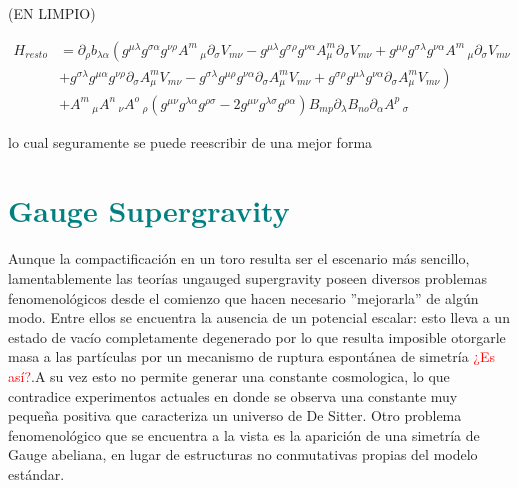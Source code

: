 \documentclass{article}
\numberwithin{equation}{section}
\begin{document}
(EN LIMPIO)

\begin{equation}
\begin{aligned}
H_{resto}&= \partial_{\rho}{b_{\lambda \alpha}} \left( g^{\mu \lambda} g^{\sigma \alpha} g^{\nu \rho} A^{m}\,_{\mu} \partial_{\sigma}{V_{m \nu}} -g^{\mu \lambda} g^{\sigma \rho} g^{\nu \alpha} A^{m}_{\mu} \partial_{\sigma}{V_{m \nu}}+g^{\mu \rho} g^{\sigma \lambda} g^{\nu \alpha} A^{m}\,_{\mu} \partial_{\sigma}{V_{m \nu}} \right.\\
& \left. +g^{\sigma \lambda} g^{\mu \alpha} g^{\nu \rho} \partial_{\sigma}{A^{m}_{\mu}} V_{m \nu} -g^{\sigma \lambda} g^{\mu \rho} g^{\nu \alpha} \partial_{\sigma}{A^{m}_{\mu}} V_{m \nu}+g^{\sigma \rho} g^{\mu \lambda} g^{\nu \alpha} \partial_{\sigma}{A^{m}_{\mu}} V_{m \nu} \right)\\
& + A^{m}\,_{\mu} A^{n}\,_{\nu} A^{o}\,_{\rho} \left( g^{\mu \nu} g^{\lambda \alpha} g^{\rho \sigma}  - 2 g^{\mu \nu} g^{\lambda \sigma} g^{\rho \alpha} \right) B_{m p} \partial_{\lambda}{B_{n o}} \partial_{\alpha}{A^{p}\,_{\sigma}}
\end{aligned}
\end{equation}

lo cual seguramente se puede reescribir de una mejor forma

\section{\textcolor{teal}{Gauge Supergravity}}

Aunque la compactificación en un toro resulta ser el escenario más sencillo, lamentablemente las teorías ungauged supergravity poseen diversos problemas fenomenológicos desde el comienzo que hacen necesario ''mejorarla'' de algún modo. Entre ellos se encuentra la ausencia de un potencial escalar: esto lleva a un estado de vacío completamente degenerado por lo que resulta imposible otorgarle masa a las partículas por un mecanismo de ruptura espontánea de simetría \textcolor{red}{¿Es así?}.A su vez esto no permite generar una constante cosmologica, lo que contradice experimentos actuales en donde se observa una constante muy pequeña positiva que caracteriza un universo de De Sitter. Otro problema fenomenológico que se encuentra a la vista es la aparición de una simetría de Gauge abeliana, en lugar de estructuras no conmutativas propias del modelo estándar. 
\end{document}
